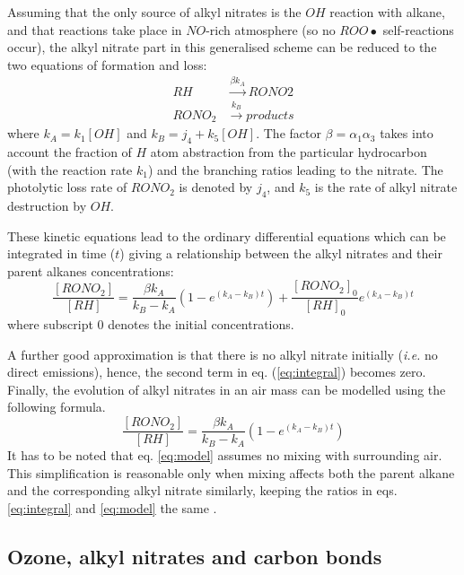 \documentclass[11pt,a4paper]{article}
\begin{document}
Assuming that the only source of alkyl nitrates is the $OH$ reaction with alkane, and that reactions take place in $NO$-rich atmosphere (so no $ROO\bullet$ self-reactions occur), the alkyl nitrate part in this generalised scheme can be reduced to the two equations of formation and loss:
\begin{subequations} \label{eq:an_form_loss0}
\begin{align}
RH &\xrightarrow{\beta k_A} RONO2 \label{eq:an_form_loss1}\\
RONO_2 &\xrightarrow{k_B} \mathit{products} \label{eq:an_form_loss2}
\end{align}
\end{subequations}
where $k_A = k_1[OH]$ and $k_B=j_4 + k_5[OH]$. The factor $\beta=\alpha_1\alpha_3$ takes into account the fraction of $H$ atom abstraction from the particular hydrocarbon (with the reaction rate $k_1$) and the branching ratios leading to the nitrate. The photolytic loss rate of $RONO_2$ is denoted by $j_4$, and $k_5$ is the rate of alkyl nitrate destruction by $OH$.

These kinetic equations lead to the ordinary differential equations which can be integrated in time ($t$) giving a relationship between the alkyl nitrates and their parent alkanes concentrations:
\begin{equation} \label{eq:integral}
\frac{[RONO_2]}{[RH]} = \frac{\beta k_A}{k_B - k_A}\left(1-e^{(k_A - k_B)t}\right)+\frac{[RONO_2]_0}{[RH]_0}e^{(k_A - k_B)t}
\end{equation}
where subscript $0$ denotes the initial concentrations.

A further good approximation is that there is no alkyl nitrate initially (\textit{i.e.} no direct emissions), hence, the second term in eq. (\eqref{eq:integral}) becomes zero. Finally, the evolution of alkyl nitrates in an air mass can be modelled using the following formula.
\begin{equation} \label{eq:model}
\frac{[RONO_2]}{[RH]} = \frac{\beta k_A}{k_B - k_A}\left(1-e^{(k_A - k_B)t}\right)
\end{equation}
It has to be noted that eq. \eqref{eq:model} assumes no mixing with surrounding air. This simplification is reasonable only when mixing affects both the parent alkane and the corresponding alkyl nitrate similarly, keeping the ratios in eqs. \eqref{eq:integral} and \eqref{eq:model} the same \citep{Reeves2007}.

\subsection{Ozone, alkyl nitrates and carbon bonds}
\end{document}
